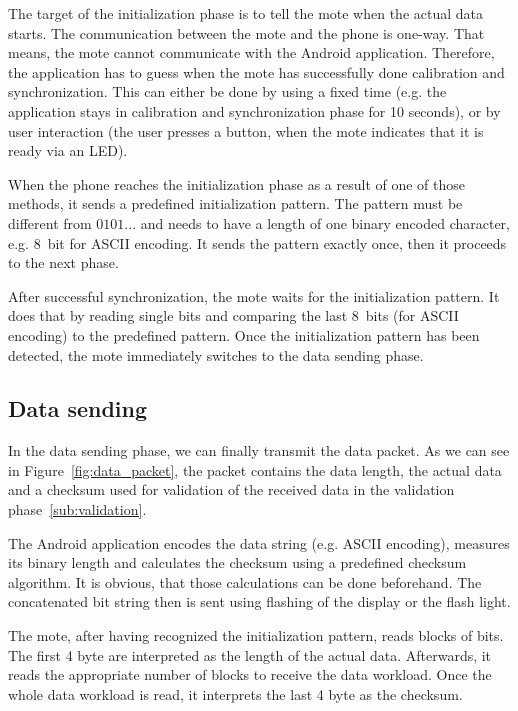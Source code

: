 \documentclass{sig-alternate} %
\begin{document}
The target of the initialization phase is to tell the mote when the actual data starts.
The communication between the mote and the phone is one-way.
That means, the mote cannot communicate with the Android application.
Therefore, the application has to guess when the mote has successfully done calibration and synchronization.
This can either be done by using a fixed time (e.g. the application stays in calibration and synchronization phase for 10 seconds), or by user interaction (the user presses a button, when the mote indicates that it is ready via an LED).

When the phone reaches the initialization phase as a result of one of those methods, it sends a predefined initialization pattern.
The pattern must be different from $0101...$ and needs to have a length of one binary encoded character, e.g. 8~bit for ASCII encoding.
It sends the pattern exactly once, then it proceeds to the next phase.

After successful synchronization, the mote waits for the initialization pattern.
It does that by reading single bits and comparing the last 8~bits (for ASCII encoding) to the predefined pattern.
Once the initialization pattern has been detected, the mote immediately switches to the data sending phase.

\subsection{Data sending}
\label{sub:data_sending}

In the data sending phase, we can finally transmit the data packet.
As we can see in Figure~\ref{fig:data_packet}, the packet contains the data length, the actual data and a checksum used for validation of the received data in the validation phase~\ref{sub:validation}.

The Android application encodes the data string (e.g. ASCII encoding), measures its binary length and calculates the checksum using a predefined checksum algorithm.
It is obvious, that those calculations can be done beforehand.
The concatenated bit string then is sent using flashing of the display or the flash light.

The mote, after having recognized the initialization pattern, reads blocks of bits.
The first 4 byte are interpreted as the length of the actual data.
Afterwards, it reads the appropriate number of blocks to receive the data workload.
Once the whole data workload is read, it interprets the last 4 byte as the checksum.
\end{document}
